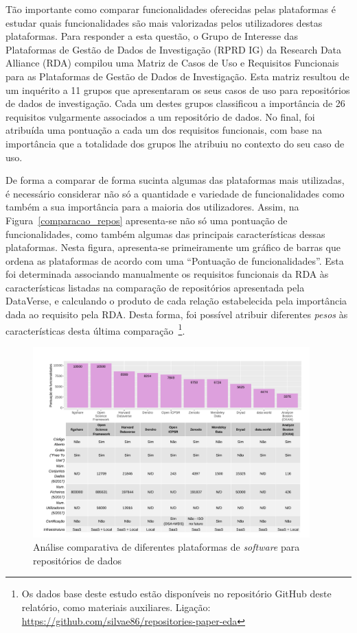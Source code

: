 \documentclass[sigconf,nonacm]{acmart}
\begin{document}
Tão importante como comparar funcionalidades oferecidas pelas plataformas é estudar quais funcionalidades são mais valorizadas pelos utilizadores destas plataformas. Para responder a esta questão, o Grupo de Interesse das Plataformas de Gestão de Dados de Investigação (RPRD IG) da Research Data Alliance (RDA) compilou uma Matriz de Casos de Uso e Requisitos Funcionais para as Plataformas de Gestão de Dados de Investigação. Esta matriz resultou de um inquérito a 11 grupos que apresentaram os seus casos de uso para repositórios de dados de investigação. Cada um destes grupos classificou a importância de 26 requisitos vulgarmente associados a um repositório de dados. No final, foi atribuída uma pontuação a cada um dos requisitos funcionais, com base na importância que a totalidade dos grupos lhe atribuiu no contexto do seu caso de uso.

De forma a comparar de forma sucinta algumas das plataformas mais utilizadas, é necessário considerar não só a quantidade e variedade de funcionalidades como também a sua importância para a maioria dos utilizadores. Assim, na Figura~\ref{comparacao_repos} apresenta-se não só uma pontuação de funcionalidades, como também algumas das principais características dessas plataformas. Nesta figura, apresenta-se primeiramente um gráfico de barras que ordena as plataformas de acordo com uma ``Pontuação de funcionalidades''. Esta foi determinada associando manualmente os requisitos funcionais da RDA às características listadas na comparação de repositórios apresentada pela DataVerse, e calculando o produto de cada relação estabelecida pela importância dada ao requisito pela RDA. Desta forma, foi possível atribuir diferentes \emph{pesos} às características desta última comparação~\footnote{Os dados base deste estudo estão disponíveis no repositório GitHub deste relatório, como materiais auxiliares. Ligação: \url{https://github.com/silvae86/repositories-paper-eda}}. 

\begin{figure}[h!t!]
\centering
\includegraphics[width=0.95\textwidth]{Sources/DataverseComparativeReview/plot.pdf}
\caption{Análise comparativa de diferentes plataformas de \emph{software} para repositórios de dados}
\end{figure}
\end{document}
